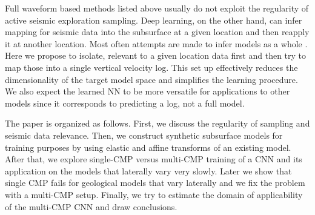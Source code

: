 \documentclass[manuscript]{geophysics}
\begin{document}
Full waveform based methods listed above usually do not exploit the regularity of active seismic exploration sampling. Deep learning, on the other hand, can infer mapping for seismic data into the subsurface at a given location and then reapply it at another location. Most often attempts are made to infer models as a whole \citep{richardson2018seismic, wu2018inversionnet, zhang2018velocitygan, yang2019deep, oye2019velocity}. Here we propose to isolate, relevant to a given location data first and then try to map those into a single vertical velocity log. This set up effectively reduces the dimensionality of the target model space and simplifies the learning procedure. We also expect the learned NN to be more versatile for applications to other models since it corresponds to predicting a log, not a full model.

The paper is organized as follows. First, we discuss the regularity of sampling and seismic data relevance.
%
Then, we construct synthetic subsurface models for training purposes by using elastic and affine transforms of an existing model.
%
After that, we explore single-CMP versus multi-CMP training of a CNN and its application on the models that laterally vary very slowly.
%
Later we show that single CMP fails for geological models that vary laterally and we fix the problem with a multi-CMP setup.
%
Finally, we try to estimate the domain of applicability of the multi-CMP CNN and draw conclusions.
\end{document}
